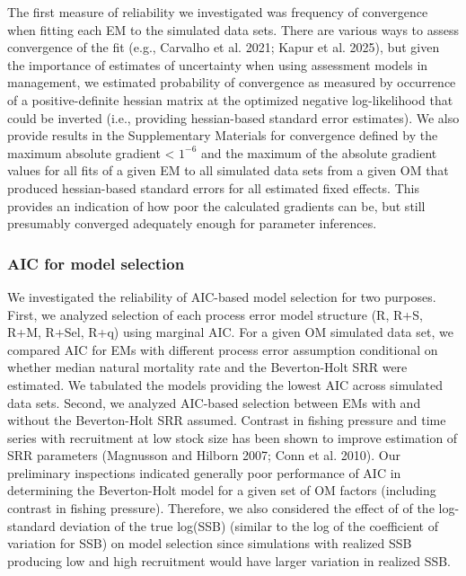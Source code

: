 \documentclass[
  12pt,
]{article}
\begin{document}
The first measure of reliability we investigated was frequency of
convergence when fitting each EM to the simulated data sets. There are
various ways to assess convergence of the fit (e.g., Carvalho et al.
2021; Kapur et al. 2025), but given the importance of estimates of
uncertainty when using assessment models in management, we estimated
probability of convergence as measured by occurrence of a
positive-definite hessian matrix at the optimized negative
log-likelihood that could be inverted (i.e., providing hessian-based
standard error estimates). We also provide results in the Supplementary
Materials for convergence defined by the maximum absolute gradient
\textless{} \(1^{-6}\) and the maximum of the absolute gradient values
for all fits of a given EM to all simulated data sets from a given OM
that produced hessian-based standard errors for all estimated fixed
effects. This provides an indication of how poor the calculated
gradients can be, but still presumably converged adequately enough for
parameter inferences.

\subsubsection*{AIC for model selection}\label{aic-for-model-selection}

We investigated the reliability of AIC-based model selection for two
purposes. First, we analyzed selection of each process error model
structure (R, R+S, R+M, R+Sel, R+q) using marginal AIC. For a given OM
simulated data set, we compared AIC for EMs with different process error
assumption conditional on whether median natural mortality rate and the
Beverton-Holt SRR were estimated. We tabulated the models providing the
lowest AIC across simulated data sets. Second, we analyzed AIC-based
selection between EMs with and without the Beverton-Holt SRR assumed.
Contrast in fishing pressure and time series with recruitment at low
stock size has been shown to improve estimation of SRR parameters
(Magnusson and Hilborn 2007; Conn et al. 2010). Our preliminary
inspections indicated generally poor performance of AIC in determining
the Beverton-Holt model for a given set of OM factors (including
contrast in fishing pressure). Therefore, we also considered the effect
of of the log-standard deviation of the true log(SSB) (similar to the
log of the coefficient of variation for SSB) on model selection since
simulations with realized SSB producing low and high recruitment would
have larger variation in realized SSB.
\end{document}
